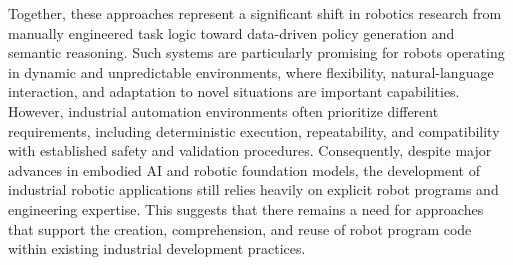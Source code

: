 Together, these approaches represent a significant shift in robotics research from manually engineered task logic toward data-driven policy generation and semantic reasoning. Such systems are particularly promising for robots operating in dynamic and unpredictable environments, where flexibility, natural-language interaction, and adaptation to novel situations are important capabilities. However, industrial automation environments often prioritize different requirements, including deterministic execution, repeatability, and compatibility with established safety and validation procedures. Consequently, despite major advances in embodied AI and robotic foundation models, the development of industrial robotic applications still relies heavily on explicit robot programs and engineering expertise. This suggests that there remains a need for approaches that support the creation, comprehension, and reuse of robot program code within existing industrial development practices.


